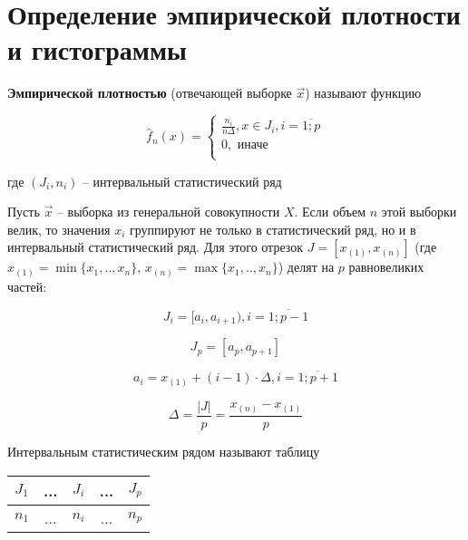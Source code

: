 \documentclass[a4paper,oneside,12pt]{extreport}
\theoremstyle{indented}
\begin{document}
\section{Определение эмпирической плотности и гистограммы}

\hfill 

    \textbf{Эмпирической плотностью} (отвечающей выборке $\vec x$) называют функцию

    \begin{equation*}
        \hat f_n(x) =
        \begin{cases}
            \frac{n_i}{n \Delta}, x \in J_i, i = \overline{1; p} \\
            0, \text{ иначе} \\
        \end{cases}
    \end{equation*}

где $(J_i, n_i)$ -- интервальный статистический ряд

\hfill

Пусть $\vec x$ -- выборка из генеральной совокупности $X$. Если объем $n$ этой выборки велик, то значения $x_i$ группируют не только в статистический ряд, но и в интервальный статистический ряд. Для этого отрезок
$J = [x_{(1)}, x_{(n)}]$ (где $x_{(1)}=\min\{x_1,..,x_n\}$, $x_{(n)}=\max\{x_1,..,x_n\}$) делят на $p$ равновеликих частей:

\begin{equation*}
    J_i = [a_i, a_{i+1}), i = \overline{1; p - 1}
\end{equation*}

\begin{equation*}
    J_{p} = [a_{p}, a_{p+1}]
\end{equation*}

$$a_i = x_{(1)} + (i-1)\cdot\Delta, i = \overline{1;p+1}$$

$$\Delta = \frac{|J|}{p} = \frac{x_{(n)} - x_{(1)}}{p}$$

    Интервальным статистическим рядом называют таблицу

    \begin{table}[H]
        \centering
        \begin{tabular}{|c|c|c|c|c|}
            \hline
            $J_1$ & ... & $J_i$ & ... & $J_p$ \\
            \hline
            $n_1$ & ... & $n_i$ & ... & $n_p$ \\
            \hline
        \end{tabular}
    \end{table}
\end{document}
